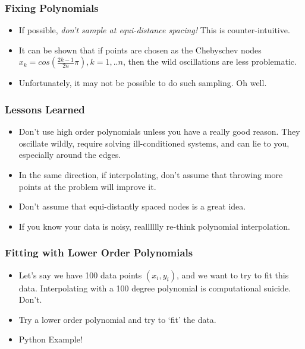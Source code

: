 \documentclass{beamer}
\begin{document}
\begin{frame}
\frametitle{Fixing Polynomials}
\begin{itemize}
\item If possible, \emph{don't sample at equi-distance spacing!} This is counter-intuitive.
\item It can be shown that if points are chosen as the Chebyschev nodes $x_k = cos(\frac{2k-1}{2n} \pi), k=1,..n$, then the wild oscillations are less problematic.
\item Unfortunately, it may not be possible to do such sampling. Oh well.
\end{itemize}
\end{frame}
\begin{frame}
\frametitle{Lessons Learned}
\begin{itemize}
\item Don't use high order polynomials unless you have a really good reason. They oscillate wildly, require solving ill-conditioned systems, and can lie to you, especially around the edges.
\item In the  same direction, if interpolating, don't assume that throwing more points at the problem will improve it.
\item Don't assume that equi-distantly spaced nodes is a great idea.
\item If you know your data is noisy, realllllly re-think polynomial interpolation. 
\end{itemize}
\end{frame}

\begin{frame}
\frametitle{Fitting with Lower Order Polynomials}
\begin{itemize}
\item Let's say we have 100 data points $(x_i,y_i)$, and we want to try to fit this data. Interpolating with a 100 degree polynomial is computational suicide. Don't.
\item Try a lower order polynomial and try to `fit' the data.
\item Python Example!
\end{itemize}
\end{frame}
\end{document}
